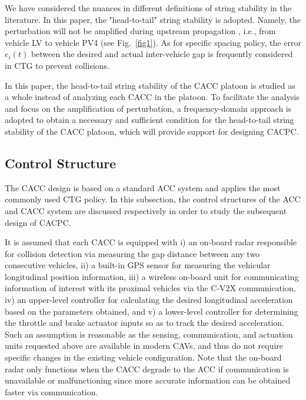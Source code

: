 \documentclass[a4paper,fleqn]{cas-sc}
\begin{document}
We have considered the nuances in different definitions of string stability in the literature. In this paper, the "head-to-tail" string stability is adopted. Namely, the perturbation will not be amplified during upstream propagation \citep{qin2021analytical,montanino2021homogeneous,jin2014dynamics,zhou2020stabilizing,wang2018infrastructure}, i.e., from vehicle LV to vehicle PV4 (see Fig.~\ref{fig1}). As for specific spacing policy, the error $e_i (t)$ between the desired and actual inter-vehicle gap is frequently considered in CTG to prevent collisions.

In this paper, the head-to-tail string stability of the CACC platoon is studied as a whole instead of analyzing each CACC in the platoon. To facilitate the analysis and focus on the amplification of perturbation, a frequency-domain approach is adopted to obtain a necessary and sufficient condition for the head-to-tail string stability of the CACC platoon, which will provide support for designing CACPC.

\subsection{Control Structure}
\label{Section 2.3}
The CACC design is based on a standard ACC system and applies the most commonly used CTG policy. In this subsection, the control structures of the ACC and CACC system are discussed respectively in order to study the subsequent design of CACPC.

It is assumed that each CACC is equipped with i) an on-board radar responsible for collision detection via measuring the gap distance between any two consecutive vehicles, ii) a built-in GPS sensor for measuring the vehicular longitudinal position information, iii) a wireless on-board unit for communicating information of interest with its proximal vehicles via the C-V2X communication, iv) an upper-level controller for calculating the desired longitudinal acceleration based on the parameters obtained, and v) a lower-level controller for determining the throttle and brake actuator inputs so as to track the desired acceleration. Such an assumption is reasonable as the sensing, communication, and actuation units requested above are available in modern CAVs, and thus do not require specific changes in the existing vehicle configuration. Note that the on-board radar only functions when the CACC degrade to the ACC if communication is unavailable or malfunctioning since more accurate information can be obtained faster via communication.
\end{document}
